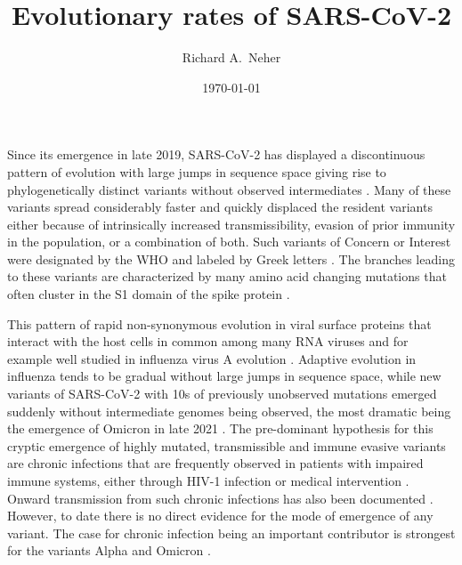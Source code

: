 \documentclass[aps,rmp, twocolumn]{revtex4}
\begin{document}
\title{Evolutionary rates of SARS-CoV-2}
\author{Richard A.~Neher}
\date{\today}
\maketitle

Since its emergence in late 2019, SARS-CoV-2 has displayed a discontinuous pattern of evolution with large jumps in sequence space giving rise to phylogenetically distinct variants without observed intermediates \citep{hodcroft_spread_2021,volz_assessing_2021,tegally_detection_2021,faria_genomics_2021,naveca_covid-19_2021,viana_rapid_2022}.
Many of these variants spread considerably faster and quickly displaced the resident variants either because of intrinsically increased transmissibility, evasion of prior immunity in the population, or a combination of both.
Such variants of Concern or Interest were designated by the WHO and labeled by Greek letters \citep{konings_sars-cov-2_2021}.
The branches leading to these variants are characterized by many amino acid changing mutations that often cluster in the S1 domain of the spike protein \citep{kistler_rapid_2022}.

This pattern of rapid non-synonymous evolution in viral surface proteins that interact with the host cells in common among many RNA viruses and for example well studied in influenza virus A evolution \citep{bhatt_genomic_2011,strelkowa_clonal_2012}.
Adaptive evolution in influenza tends to be gradual without large jumps in sequence space, while new variants of SARS-CoV-2 with 10s of previously unobserved mutations emerged suddenly without intermediate genomes being observed, the most dramatic being the emergence of Omicron in late 2021 \citep{viana_rapid_2022}.
The pre-dominant hypothesis for this cryptic emergence of highly mutated, transmissible and immune evasive variants are chronic infections that are frequently observed in patients with impaired immune systems, either through HIV-1 infection \citep{cele_sars-cov-2_2022} or medical intervention \citep{choi_persistence_2020,kemp_sars-cov-2_2021}.
Onward transmission from such chronic infections has also been documented \citep{gonzalez-reiche_intrahost_2022}.
However, to date there is no direct evidence for the mode of emergence of any variant.
The case for chronic infection being an important contributor is strongest for the variants Alpha and Omicron \citep{hill_origins_2022}.
\end{document}
